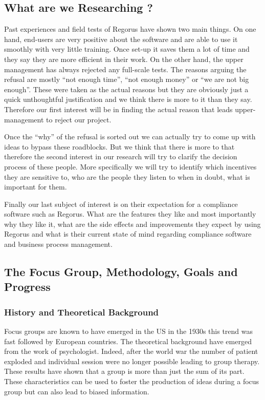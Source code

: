 \documentclass[10pt]{report}
\begin{document}
\subsection{What are we Researching ?}
Past experiences and field tests of Regorus have shown two main things. On one hand, end-users are very positive about the software and are able to use it smoothly with very little training. Once set-up it saves them a lot of time and they say they are more efficient in their work. On the other hand, the upper management has always rejected any full-scale tests. The reasons arguing the refusal are mostly \enquote{not enough time}, \enquote{not enough money} or \enquote{we are not big enough}. These were taken as the actual reasons but they are obviously just a quick unthoughtful justification and we think there is more to it than they say. Therefore our first interest will be in finding the actual reason that leads upper-management to reject our project.

Once the \enquote{why} of the refusal is sorted out we can actually try to come up with ideas to bypass these roadblocks. But we think that there is more to that therefore the second interest in our research will try to clarify the decision process of these people. More specifically we will try to identify which incentives they are sensitive to, who are the people they listen to when in doubt, what is important for them.

Finally our last subject of interest is on their expectation for a compliance software such as Regorus. What are the features they like and most importantly why they like it, what are the side effects and improvements they expect by using Regorus and what is their current state of mind regarding compliance software and business process management.



\subsection{The Focus Group, Methodology, Goals and Progress}

\subsubsection{History and Theoretical Background}
Focus groups are known to have emerged in the US in the 1930s this trend was fast followed by European countries. The theoretical background have emerged from the work of psychologist. Indeed, after the world war the number of patient exploded and individual session were no longer possible leading to group therapy. These results have shown that a group is more than just the sum of its part. These characteristics can be used to foster the production of ideas during a focus group but can also lead to biased information.
\end{document}
